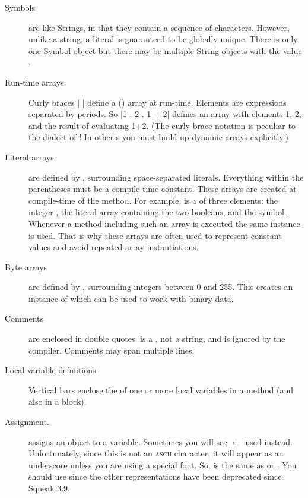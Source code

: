 \documentclass[a4paper,10pt,twoside]{book}
\begin{document}
\begin{description}
\item[Symbols] are like Strings, in that they contain a sequence of characters.  
	However, unlike a string, a literal  is guaranteed to be globally unique.
	There is only one Symbol object  but there may be multiple String objects with the value .

\item[Run-time arrays.]
	Curly braces \ct|{ }| define a () array at run-time.
	Elements are expressions separated by periods.
	So \ct|{1 . 2 . 1 + 2}| defines an array with elements 1, 2, and the result of evaluating 1+2.
	(The curly-brace notation is peculiar to the \sq dialect of \st!
	In other \st{}s you must build up dynamic arrays explicitly.)
	
\item[Literal arrays] are defined by \ct{#( )}, surrounding space-separated literals.
	Everything within the parentheses must be a compile-time constant.
	These arrays are created at compile-time of the method.
	For example,  is a   of three elements: the integer , the literal array containing the two booleans, and the symbol .
	Whenever a method including such an array is executed the same instance is used.
	That is why these arrays are often used to represent constant values and avoid repeated array instantiations.

\item[Byte arrays] are defined by \ct{#[ ]}, surrounding integers between 0 and 255.
	This creates an instance of  which can be used to work with binary data.

\item[Comments] are enclosed in double quotes.
	 is a , not a string, and is ignored by the \sq compiler.
	Comments may span multiple lines.
	
\item[Local variable definitions.]
	Vertical bars \ct{| |} enclose the  of one or more local variables in a method (and also in a block).

\item[Assignment.]
	\ct{:=} assigns an object to a variable.
	Sometimes you will see $\leftarrow$ used instead.
	Unfortunately, since this is not an \textsc{ascii} character, it will appear as an underscore unless you are using a special font.
	So,  is the same as  or .
	You should use \ct{:=} since the other representations have been deprecated since Squeak 3.9.


\end{description}
\end{document}

